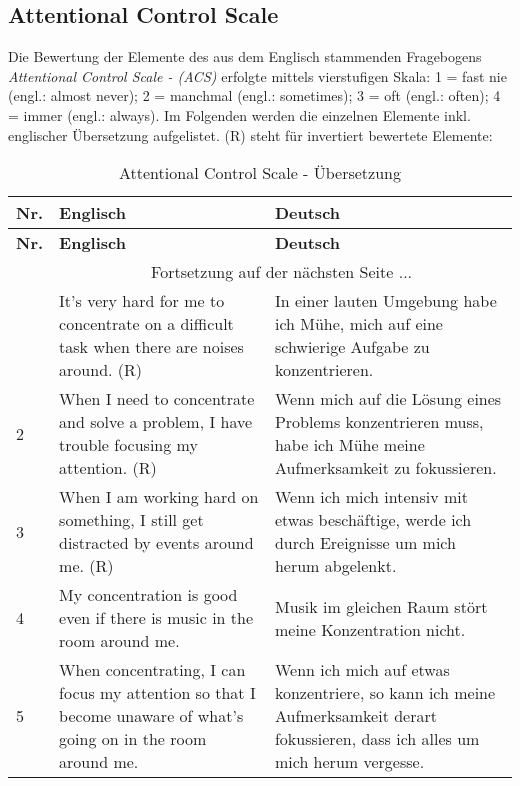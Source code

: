 \begin{RaggedRight}
\section{Attentional Control Scale}\label{appendix.acs}
Die Bewertung der Elemente des aus dem Englisch stammenden Fragebogens \textit{Attentional Control Scale - (ACS)} \cite{Derryberry2002} erfolgte mittels vierstufigen Skala: 1 = fast nie (engl.: almost never); 2 = manchmal (engl.: sometimes); 3 = oft (engl.: often); 4 = immer (engl.: always).\newline
Im Folgenden werden die einzelnen Elemente inkl. englischer Übersetzung aufgelistet. (R) steht für invertiert bewertete Elemente:
\begin{center}
    \begin{longtable}[t]{|l|p{6.6 cm}|p{6.6 cm}|}
    \caption{Attentional Control Scale - Übersetzung} \\ \hline
        \textbf{Nr.} & \textbf{Englisch} & \textbf{Deutsch} \\ \hline
        \endfirsthead
        \hline
        \textbf{Nr.} & \textbf{Englisch} & \textbf{Deutsch} \\ \hline
        \endhead 
        & \multicolumn{2}{|c|}{Fortsetzung auf der nächsten Seite $...$ } \\ \hline
        \endfoot
        \hline
        \endlastfoot
        1 & It’s very hard for me to concentrate on a difficult task when there are noises around. (R) & In einer lauten Umgebung habe ich Mühe, mich auf eine schwierige Aufgabe zu konzentrieren.\\ 
        2 & When I need to concentrate and solve a problem, I have trouble focusing my attention. (R) & Wenn mich auf die Lösung eines Problems konzentrieren muss, habe ich Mühe meine Aufmerksamkeit zu fokussieren.\\ 
        3 & When I am working hard on something, I still get distracted by events around me. (R) & Wenn ich mich intensiv mit etwas beschäftige, werde ich durch Ereignisse um mich herum abgelenkt.\\ 
        4 & My concentration is good even if there is music in the room around me. & Musik im gleichen Raum stört meine Konzentration nicht.\\
        5 & When concentrating, I can focus my attention so that I become unaware of what’s going on in the room around me. & Wenn ich mich auf etwas konzentriere,  so kann ich meine Aufmerksamkeit derart fokussieren, dass ich alles um mich herum vergesse. \\

\end{longtable}
\end{center}
\end{RaggedRight}
